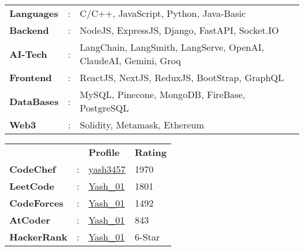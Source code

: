 \documentclass[letterpaper,11pt]{article}
\begin{document}
\begin{minipage}[t]{0.55\textwidth}
    \vspace{1pt}
    \begin{tabular}{>{\raggedright}p{2.2cm} p{0.3cm} p{8.8cm}}
        \textbf{Languages} & : & C/C++, JavaScript, Python, Java-Basic \\
        \textbf{Backend} & : & NodeJS, ExpressJS, Django, FastAPI, Socket.IO \\
        \textbf{AI-Tech} & : & LangChain, LangSmith, LangServe, OpenAI, ClaudeAI, Gemini, Groq \\
        \textbf{Frontend} & : & ReactJS, NextJS, ReduxJS, BootStrap, GraphQL \\
        \textbf{DataBases} & : & MySQL, Pinecone, MongoDB, FireBase, PostgreSQL \\
        \textbf{Web3} & : & Solidity, Metamask, Ethereum \\
    \end{tabular}
\end{minipage}
\hfill
\begin{minipage}[t]{0.40\textwidth}
    \raggedleft
    \vspace{1pt}
    \renewcommand{\arraystretch}{1.1}
    \begin{tabular}{>{\raggedright}p{2.5cm} p{0.1cm} P{2cm} P{2cm}}
        \textbf{} & \textbf{} & \textbf{Profile} & \textbf{Rating} \\
\textbf{CodeChef} & : & {\href{https://www.codechef.com/users/yash3457}{\underline{yash3457}}} & 1970 \\
\textbf{LeetCode} & : & {\href{https://leetcode.com/u/Yash_01/}{\underline{Yash\_01}}} & 1801 \\
\textbf{CodeForces} & : & {\href{https://codeforces.com/profile/Yash_01}{\underline{Yash\_01}}} & 1492 \\
\textbf{AtCoder} & : & {\href{https://atcoder.jp/users/Yash_01}{\underline{Yash\_01}}} & 843 \\
\textbf{HackerRank} & : & {\href{https://www.hackerrank.com/profile/Yash_01}{\underline{Yash\_01}}} & 6-Star \\
    \end{tabular}
\end{minipage}
 
\end{document}
